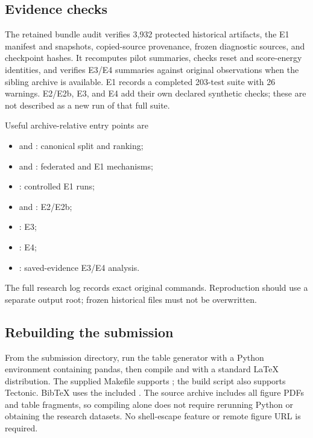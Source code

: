 \subsection{Evidence checks}
The retained bundle audit verifies 3,932 protected historical artifacts,
the E1 manifest and snapshots, copied-source provenance, frozen diagnostic
sources, and checkpoint hashes. It recomputes pilot summaries, checks reset
and score-energy identities, and verifies E3/E4 summaries against original
observations when the sibling archive is available. E1 records a completed
203-test suite with 26 warnings. E2/E2b, E3, and E4 add their own declared
synthetic checks; these are not described as a new run of that full suite.

Useful archive-relative entry points are
\begin{itemize}
\item {} and : canonical split and ranking;
\item {} and : federated and E1 mechanisms;
\item {}: controlled E1 runs;
\item {} and
: E2/E2b;
\item {}: E3;
\item {}: E4;
\item {}: saved-evidence E3/E4 analysis.
\end{itemize}
The full research log records exact original commands. Reproduction should
use a separate output root; frozen historical files must not be overwritten.

\subsection{Rebuilding the submission}
From the submission directory, run the table generator with a Python
environment containing pandas, then compile  and
 with a standard LaTeX distribution. The supplied
Makefile supports ; the build script also supports
Tectonic. BibTeX uses the included . The source
archive includes all figure PDFs and table fragments, so compiling alone
does not require rerunning Python or obtaining the research datasets.
No shell-escape feature or remote figure URL is required.


